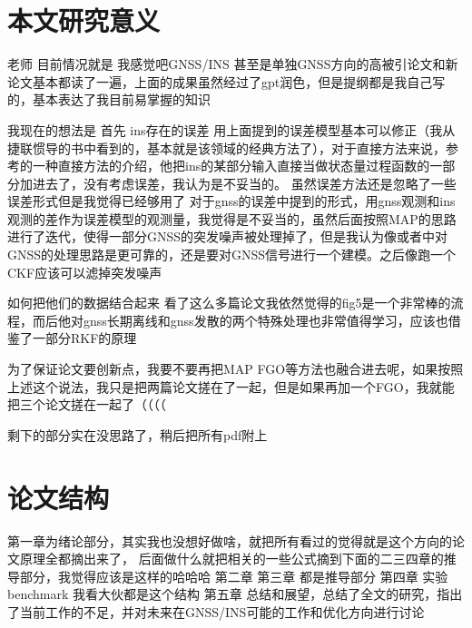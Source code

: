 \section{本文研究意义}

老师 目前情况就是 我感觉吧GNSS/INS 甚至是单独GNSS方向的高被引论文和新论文基本都读了一遍，上面的成果虽然经过了gpt润色，但是提纲都是我自己写的，基本表达了我目前易掌握的知识

我现在的想法是
首先 ins存在的误差 用上面提到的误差模型基本可以修正（我从捷联惯导的书中看到的，基本就是该领域的经典方法了），对于直接方法来说，参考\citet{hu2018new}的一种直接方法的介绍，他把ins的某部分输入直接当做状态量过程函数的一部分加进去了，没有考虑误差，我认为是不妥当的。
虽然误差方法还是忽略了一些误差形式但是我觉得已经够用了
对于gnss的误差\citet{electronics14040660}中提到的形式，用gnss观测和ins观测的差作为误差模型的观测量，我觉得是不妥当的，虽然后面按照MAP的思路进行了迭代，使得一部分GNSS的突发噪声被处理掉了，但是我认为像\citet{xie2025adaptive}或者\citet{8930069}中对GNSS的处理思路是更可靠的，还是要对GNSS信号进行一个建模。之后像\citet{xie2025adaptive}跑一个CKF应该可以滤掉突发噪声

如何把他们的数据结合起来 看了这么多篇论文我依然觉得\citet{8930069}的fig5是一个非常棒的流程，而后他对gnss长期离线和gnss发散的两个特殊处理也非常值得学习，应该也借鉴了一部分RKF的原理

为了保证论文要创新点，我要不要再把MAP FGO等方法也融合进去呢，如果按照上述这个说法，我只是把两篇论文搓在了一起，但是如果再加一个FGO，我就能把三个论文搓在一起了（（（（

剩下的部分实在没思路了，稍后把所有pdf附上



\section{论文结构}

第一章为绪论部分，其实我也没想好做啥，就把所有看过的觉得就是这个方向的论文原理全都摘出来了， 后面做什么就把相关的一些公式摘到下面的二三四章的推导部分，我觉得应该是这样的哈哈哈
第二章
第三章  都是推导部分
第四章 实验 benchmark 我看大伙都是这个结构 
第五章 总结和展望，总结了全文的研究，指出了当前工作的不足，并对未来在GNSS/INS可能的工作和优化方向进行讨论




